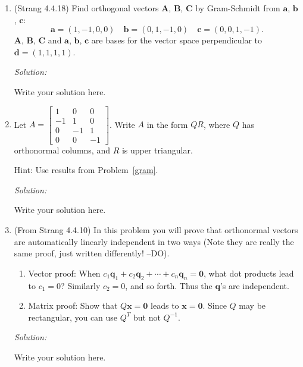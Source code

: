 \documentclass[11pt]{article}
\renewcommand{\vec}[1]{\ensuremath{\mathbf{#1}}}
\newenvironment{sol}
    {\emph{Solution:}
    }
\newcommand{\headings}{
\large{\textbf{YOUR NAME GOES HERE \hfill 21-241 Fall 2019}\\
\textbf{Homework 6 \hfill Due Friday, October 11}}\\
\rule[0.1in]{\textwidth}{0.01in}
}
\begin{document}
\headings

\begin{enumerate}
\section*{Required Problems}
\item\label{gram} (Strang 4.4.18) Find orthogonal vectors $\vec{A}$, $\vec{B}$, $\vec{C}$ by Gram-Schmidt from $\vec{a}$, $\vec{b}$, $\vec{c}$:
\[\vec{a} = (1,-1,0,0) \quad \vec{b} = (0, 1, -1, 0) \quad \vec{c} = (0,0,1,-1).\]
$\vec{A}$, $\vec{B}$, $\vec{C}$ and $\vec{a}$, $\vec{b}$, $\vec{c}$ are bases for the vector space perpendicular to $\vec{d} = (1,1,1,1)$.

 \begin{sol}
Write your solution here.
\end{sol}
\clearpage


\item Let $A = \begin{bmatrix} 1 & 0 & 0 \\ -1 & 1  & 0 \\ 0 & -1 & 1 \\ 0 & 0 & -1 \end{bmatrix}$.  Write $A$ in the form $QR$, where $Q$ has orthonormal columns, and $R$ is upper triangular.  

Hint: Use results from Problem~\ref{gram}.


 \begin{sol}
Write your solution here.
\end{sol}
\clearpage

\item\label{ortho} (From Strang 4.4.10) In this problem you will prove that orthonormal vectors are automatically linearly independent in two ways (Note they are really the same proof, just written differently! --DO).
\begin{enumerate}
\item Vector proof: When $c_1 \vec{q}_1 + c_2 \vec{q}_2 + \cdots + c_n \vec{q}_n = \vec{0}$, what dot products lead to $c_1 = 0$?  Similarly $c_2 = 0$, and so forth.  Thus the $\vec{q}$'s are independent.
\item Matrix proof: Show that $Q\vec{x} = \vec{0}$ leads to $\vec{x} = \vec{0}$. Since $Q$ may be rectangular, you can use $Q^T$ but not $Q^{-1}$.
\end{enumerate}

 \begin{sol}
Write your solution here.
\end{sol}
\clearpage


\end{enumerate}
\end{document}
